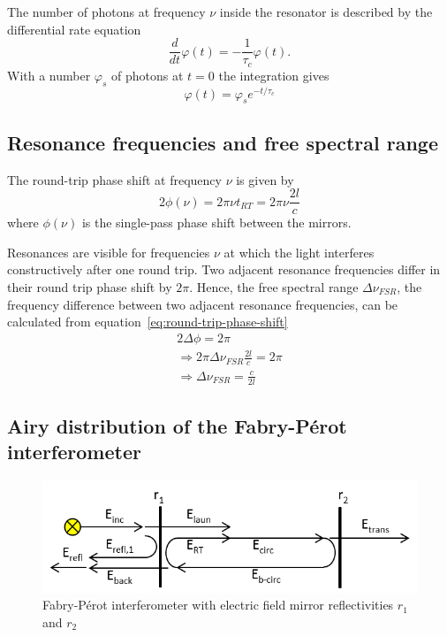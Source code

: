 The number of photons at frequency $\nu$ inside the resonator is described by the differential rate equation
\begin{equation}
\frac{d}{dt} \varphi(t) = - \frac{1}{\tau_c}\varphi(t).
\end{equation}
With a number $\varphi_s$ of photons at $t=0$ the integration gives
\begin{equation}
\varphi(t)=\varphi_s e^{-t/\tau_c}
\end{equation}

\subsection{Resonance frequencies and free spectral range}
The round-trip phase shift at frequency $\nu$ is given by 
\begin{equation}
\label{eq:round-trip-phase-shift}
2 \phi(\nu) = 2 \pi \nu t_{RT} = 2 \pi \nu \frac{2l}{c}
\end{equation}
where $\phi(\nu)$ is the single-pass phase shift between the mirrors.

Resonances are visible for frequencies $\nu$ at which the light interferes constructively after one round trip.
Two adjacent resonance frequencies differ in their round trip phase shift by $2 \pi$.
Hence, the free spectral range $\Delta \nu_{FSR}$, the frequency difference between two adjacent resonance frequencies, can be calculated from equation~\eqref{eq:round-trip-phase-shift}
\begin{align}
2\Delta\phi = 2\pi \\
\Rightarrow 2\pi\Delta\nu_{FSR}\frac{2l}{c} = 2\pi\\
\Rightarrow \Delta\nu_{FSR} = \frac{c}{2l}
\end{align}

\subsection{Airy distribution of the Fabry-Pérot interferometer}
\begin{figure}[H]
	\centering
	\includegraphics[width=0.7\linewidth]{figures/fabry-perot/Schematic_of_the_Fabry-Perot_interferometer}
	\caption{Fabry-Pérot interferometer with electric field mirror reflectivities $r_1$ and $r_2$}
	\label{fig:schematicofthefabry-perotinterferometer}
\end{figure}


